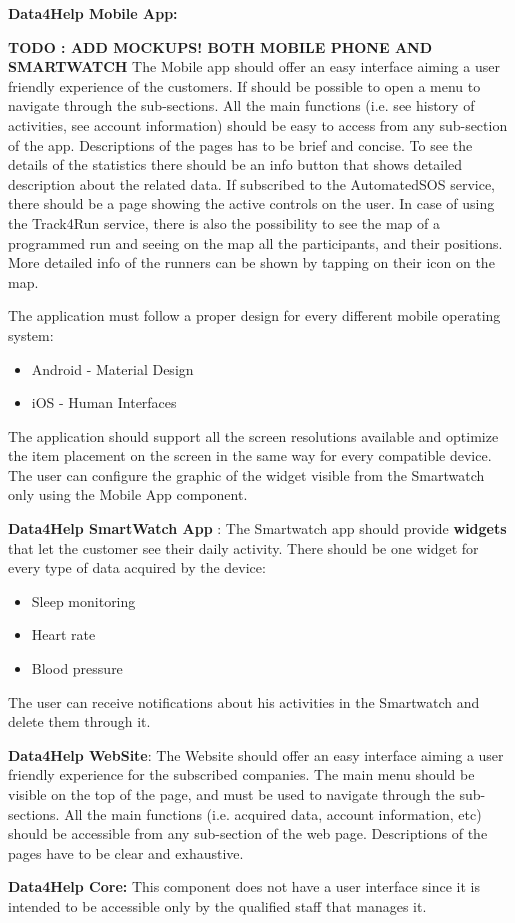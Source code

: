 \textbf{Data4Help Mobile App:}

\textbf{TODO : ADD MOCKUPS! BOTH MOBILE PHONE AND SMARTWATCH} \newline
The Mobile app should offer an easy interface aiming a user friendly experience of the customers. If should be possible to open a menu to navigate through the sub-sections. All the main functions (i.e. see history of activities, see account information) should be easy to access from any sub-section of the app. 
Descriptions of the pages has to be brief and concise.
To see the details of the statistics there should be an info button that shows detailed description about the related data.
If subscribed to the AutomatedSOS service, there should be a page showing the active controls on the user.
In case of using the Track4Run service, there is also the possibility to see the map of a programmed run and seeing on the map all the participants, and their positions. More detailed info of the runners can be shown by tapping on their icon on the map.

The application must follow a proper design for every different mobile operating system:
\begin{itemize}
    \item Android - \vspace{0.3cm} Material Design
    \item iOS - \vspace{0.3cm} Human Interfaces
\end{itemize}
The application should support all the screen resolutions available and optimize the item placement on the screen in the same way for every compatible device.
\newline
The user can configure the graphic of the widget visible from the Smartwatch only using the Mobile App component.



\textbf{Data4Help SmartWatch App} :
The Smartwatch app should provide \textbf{widgets} that let the customer see their daily activity.
There should be one widget for every type of data acquired by the device:
\begin{itemize}
    \item Sleep monitoring 
    \item Heart rate
    \item Blood pressure
\end{itemize}
The user can receive notifications about his activities in the Smartwatch and delete them through it.
\newline

\textbf{Data4Help WebSite}: The Website should offer an easy interface aiming a user friendly experience for the subscribed companies. The main menu should be visible on the top of the page, and must be used to navigate through the sub-sections. All the main functions (i.e. acquired data, account information, etc) should be accessible from any sub-section of the web page. 
Descriptions of the pages have to be clear and exhaustive.
\newline

\textbf{Data4Help Core:} This component does not have a user interface since it is intended to be accessible only by the qualified staff that manages it. 